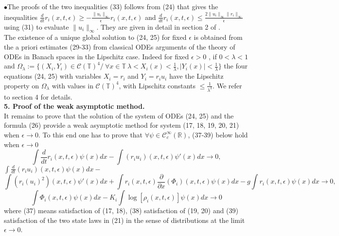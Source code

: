 \documentclass[a4paper,12pt]{article}
\begin{document}
 $\bullet$The proofs of the two inequalities (33) follows from (24) that gives the inequalities $\frac{d}{dt}r_i(x,t,\epsilon)\geq-\frac{\|u_i\|_\infty}{\epsilon}r_i(x,t,\epsilon)$ and $\frac{d}{dt}r_i(x,t,\epsilon)\leq \frac{2\|u_i\|_\infty\|r_i\|_\infty}{\epsilon}$ using (31) to evaluate $\|u_i\|_\infty$. They are  given in detail in section 2 of \cite{Colombeaugravitation}. \\

 The existence of a unique global solution to (24, 25) for fixed $\epsilon$ is obtained from the a priori estimates (29-33)  from classical ODEs arguments of the theory of ODEs in Banach spaces in the Lipschitz case. Indeed for fixed $\epsilon>0$ , if $0<\lambda<1$ and $\Omega_\lambda:=\{(X_i,Y_i)\in \mathcal{C}(\mathbb{T})^4 /  \ \forall x\in \mathbb{T} \ \lambda<X_i(x)<\frac{1}{\lambda}, |Y_i(x)|<\frac{1}{\lambda}\}$ the four equations (24, 25) with variables $X_i=r_i$ and $ Y_i=r_i u_i$ have the Lipschitz property on $\Omega_\lambda$ with values in $\mathcal{C}(\mathbb{T})^4$, with Lipschitz constants $\leq \frac{1}{\lambda^3}$. We refer to \cite {Colombeaugravitation} section 4 for details.\\
 

\textbf{5. Proof of the weak asymptotic method.} \\
  It remains to prove that the solution of the system of ODEs (24, 25) and the formula (26)  provide a weak asymptotic method for system (17, 18, 19, 20, 21) when $\epsilon\rightarrow 0$. To this end one has to prove that $\forall \psi\in \mathcal{C}_c^\infty(\mathbb{R})$, (37-39) below hold when $\epsilon\rightarrow 0$
 \begin{equation} \int \frac{d}{dt}r_i(x,t,\epsilon)\psi(x)dx-\int (r_i u_i)(x,t,\epsilon)\psi'(x)dx \rightarrow 0,\end{equation}
  $ \int \frac{d}{dt}(r_i u_i)(x,t,\epsilon)\psi(x)dx-$\begin{equation}\int (r_i (u_i)^2)(x,t,\epsilon)\psi'(x)dx +\int r_i(x,t,\epsilon)\frac{\partial}{\partial x}(\Phi_i)(x,t,\epsilon)\psi(x)dx-g\int r_i(x,t,\epsilon)\psi(x)dx\rightarrow 0,\end{equation}
  \begin{equation}  \int\Phi_i(x,t,\epsilon)\psi(x)dx-K_i\int  \log[\rho_i(x,t,\epsilon)]\psi(x)dx\rightarrow 0 \end{equation} 
 where (37) means satisfaction of (17, 18), (38) satisfaction of (19, 20) and (39) satisfaction of the two state laws in (21) in the sense of distributions at the limit $\epsilon\rightarrow 0$.\\ 
\end{document}
